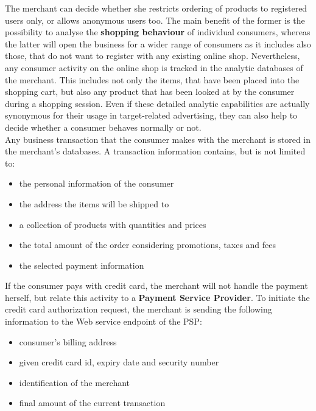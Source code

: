 The merchant can decide whether she restricts ordering of products to registered users only, or allows anonymous users too. The main benefit of the former is the possibility to analyse the \textbf{shopping behaviour} of individual consumers, whereas the latter will open the business for a wider range of consumers as it includes also those, that do not want to register with any existing online shop. Nevertheless, any consumer activity on the online shop is tracked in the analytic databases of the merchant. This includes not only the items, that have been placed into the shopping cart, but also any product that has been looked at by the consumer during a shopping session. Even if these detailed analytic capabilities are actually synonymous for their usage in target-related advertising, they can also help to decide whether a consumer behaves normally or not. \\

Any business transaction that the consumer makes with the merchant is stored in the merchant's databases. A transaction information contains, but is not limited to:\@

\begin{itemize}
		\item the personal information of the consumer
		\item the address the items will be shipped to
		\item a collection of products with quantities and prices
		\item the total amount of the order considering promotions, taxes and fees
		\item the selected payment information
\end{itemize}

If the consumer pays with credit card, the merchant will not handle the payment herself, but relate this activity to a \textbf{Payment Service Provider}. To initiate the credit card authorization request, the merchant is sending the following information to the Web service endpoint of the \gls{PSP}: \@

\begin{itemize}
    \item consumer's billing address
    \item given credit card id, expiry date and security number
    \item identification of the merchant
    \item final amount of the current transaction
\end{itemize}

